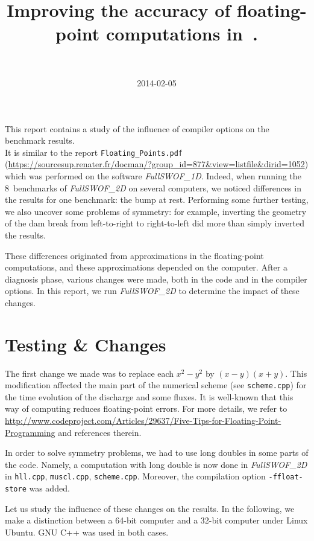 \documentclass[a4paper, 11pt]{article}
\title{Improving the accuracy of floating-point computations
in~\FullSWOF{}.}
\author{\contactFullName\\ \contactEmail}
\date{2014-02-05} %
\newcommand{\FullSWOF}{\emph{FullSWOF\_2D}}
\begin{document}
\maketitle

\thispagestyle{fancy}

This report contains a study of the influence of compiler options on the benchmark results.\\ 
It is similar to the report \texttt{Floating\_Points.pdf} (\url{https://sourcesup.renater.fr/docman/?group_id=877&view=listfile&dirid=1052}) which was performed on the software \emph{\textit{FullSWOF\_1D}}.
 Indeed, when running the 8~benchmarks of \emph{\textit{FullSWOF\_2D}} on several computers, we noticed differences in the results for one benchmark: the bump at rest. 
Performing some further testing, we also uncover some problems of symmetry: for example, inverting the geometry of the dam break from left-to-right to right-to-left did more than simply inverted the results.

These differences originated from approximations in the floating-point computations, and these approximations depended on the computer. After a diagnosis phase, various changes were made, both in the code and in the compiler options. In this report, we run \FullSWOF{} to determine the impact of these changes.

\section*{Testing \& Changes}

The first change we made was to replace each $x^2-y^2$ by $(x-y)(x+y)$. This modification affected the main part of the numerical scheme (see \texttt{scheme.cpp})
for the time evolution of the discharge and some fluxes. 
It is well-known that this way of computing reduces floating-point errors. 
For more details, we refer to \url{http://www.codeproject.com/Articles/29637/Five-Tips-for-Floating-Point-Programming}
and references therein. 

In order to solve symmetry problems, we had to use long doubles in some parts of the code. Namely, 
a computation with long double is now done in \FullSWOF{} in \texttt{hll.cpp}, \texttt{muscl.cpp}, \texttt{scheme.cpp}.
Moreover, the compilation option \texttt{-ffloat-store} was added. 

Let us study the influence of these changes on the results. In the following, we make a distinction between a 64-bit computer  and a 32-bit computer under Linux Ubuntu.
GNU C++ was used in both cases.
\end{document}
